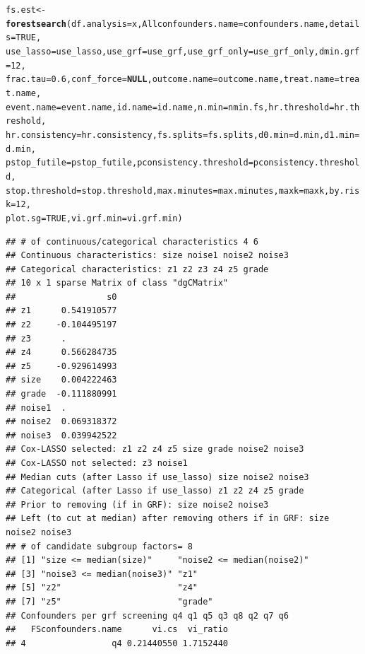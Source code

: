 \documentclass[smallextended]{svjour3}
\makeatletter
\newcommand{\hlnum}[1]{\textcolor[rgb]{0.686,0.059,0.569}{#1}}%
\newcommand{\hlstd}[1]{\textcolor[rgb]{0.345,0.345,0.345}{#1}}%
\newcommand{\hlkwa}[1]{\textcolor[rgb]{0.161,0.373,0.58}{\textbf{#1}}}%
\newcommand{\hlkwb}[1]{\textcolor[rgb]{0.69,0.353,0.396}{#1}}%
\newcommand{\hlkwc}[1]{\textcolor[rgb]{0.333,0.667,0.333}{#1}}%
\newcommand{\hlkwd}[1]{\textcolor[rgb]{0.737,0.353,0.396}{\textbf{#1}}}%
\newenvironment{kframe}{%
 \def\at@end@of@kframe{}%
 \ifinner\ifhmode%
  \def\at@end@of@kframe{\end{minipage}}%
  \begin{minipage}{\columnwidth}%
 \fi\fi%
 \def\FrameCommand##1{\hskip\@totalleftmargin \hskip-\fboxsep
 \colorbox{shadecolor}{##1}\hskip-\fboxsep
     \hskip-\linewidth \hskip-\@totalleftmargin \hskip\columnwidth}%
 \MakeFramed {\advance\hsize-\width
   \@totalleftmargin\z@ \linewidth\hsize
   \@setminipage}}%
 {\par\unskip\endMakeFramed%
 \at@end@of@kframe}
\newenvironment{knitrout}{}{} %
\makeatother
\begin{document}
\begin{knitrout}
\begin{kframe}
\begin{alltt}
\hlstd{fs.est} \hlkwb{<-} \hlkwd{forestsearch}\hlstd{(}\hlkwc{df.analysis} \hlstd{= x,} \hlkwc{Allconfounders.name} \hlstd{= confounders.name,} \hlkwc{details} \hlstd{=} \hlnum{TRUE}\hlstd{,}
    \hlkwc{use_lasso} \hlstd{= use_lasso,} \hlkwc{use_grf} \hlstd{= use_grf,} \hlkwc{use_grf_only} \hlstd{= use_grf_only,} \hlkwc{dmin.grf} \hlstd{=} \hlnum{12}\hlstd{,}
    \hlkwc{frac.tau} \hlstd{=} \hlnum{0.6}\hlstd{,} \hlkwc{conf_force} \hlstd{=} \hlkwa{NULL}\hlstd{,} \hlkwc{outcome.name} \hlstd{= outcome.name,} \hlkwc{treat.name} \hlstd{= treat.name,}
    \hlkwc{event.name} \hlstd{= event.name,} \hlkwc{id.name} \hlstd{= id.name,} \hlkwc{n.min} \hlstd{= nmin.fs,} \hlkwc{hr.threshold} \hlstd{= hr.threshold,}
    \hlkwc{hr.consistency} \hlstd{= hr.consistency,} \hlkwc{fs.splits} \hlstd{= fs.splits,} \hlkwc{d0.min} \hlstd{= d.min,} \hlkwc{d1.min} \hlstd{= d.min,}
    \hlkwc{pstop_futile} \hlstd{= pstop_futile,} \hlkwc{pconsistency.threshold} \hlstd{= pconsistency.threshold,}
    \hlkwc{stop.threshold} \hlstd{= stop.threshold,} \hlkwc{max.minutes} \hlstd{= max.minutes,} \hlkwc{maxk} \hlstd{= maxk,} \hlkwc{by.risk} \hlstd{=} \hlnum{12}\hlstd{,}
    \hlkwc{plot.sg} \hlstd{=} \hlnum{TRUE}\hlstd{,} \hlkwc{vi.grf.min} \hlstd{= vi.grf.min)}
\end{alltt}
\begin{verbatim}
## # of continuous/categorical characteristics 4 6 
## Continuous characteristics: size noise1 noise2 noise3 
## Categorical characteristics: z1 z2 z3 z4 z5 grade 
## 10 x 1 sparse Matrix of class "dgCMatrix"
##                  s0
## z1      0.541910577
## z2     -0.104495197
## z3      .          
## z4      0.566284735
## z5     -0.929614993
## size    0.004222463
## grade  -0.111880991
## noise1  .          
## noise2  0.069318372
## noise3  0.039942522
## Cox-LASSO selected: z1 z2 z4 z5 size grade noise2 noise3 
## Cox-LASSO not selected: z3 noise1 
## Median cuts (after Lasso if use_lasso) size noise2 noise3 
## Categorical (after Lasso if use_lasso) z1 z2 z4 z5 grade 
## Prior to removing (if in GRF): size noise2 noise3 
## Left (to cut at median) after removing others if in GRF: size noise2 noise3 
## # of candidate subgroup factors= 8 
## [1] "size <= median(size)"     "noise2 <= median(noise2)"
## [3] "noise3 <= median(noise3)" "z1"                      
## [5] "z2"                       "z4"                      
## [7] "z5"                       "grade"                   
## Confounders per grf screening q4 q1 q5 q3 q8 q2 q7 q6 
##   FSconfounders.name      vi.cs  vi_ratio
## 4                 q4 0.21440550 1.7152440

\end{verbatim}
\end{kframe}
\end{knitrout}
\end{document}
